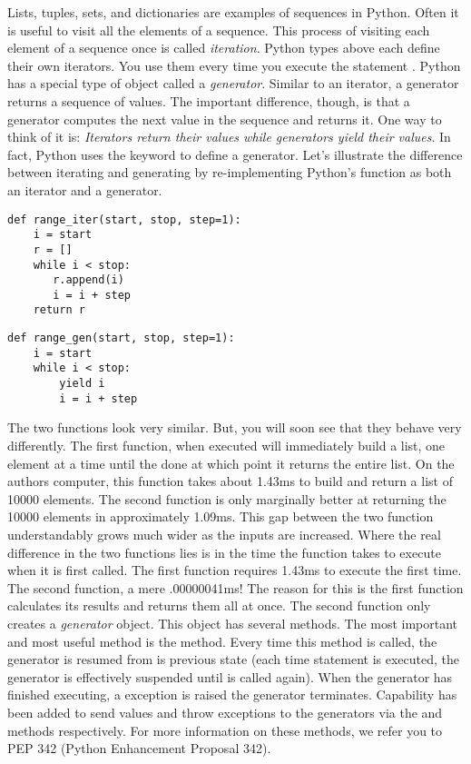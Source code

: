 \label{lab:Python_Generators}

Lists, tuples, sets, and dictionaries are examples of sequences in Python.
Often it is useful to visit all the elements of a sequence.  This process of visiting
each element of a sequence once is called \emph{iteration}. 
Python types above each define their own iterators.  You use them every time you execute the statement .
Python has a special type of object called a \emph{generator}.
Similar to an iterator, a generator returns a sequence of values.
The important difference, though, is that a generator computes the next value in the sequence and returns it.
One way to think of it is: \emph{Iterators return their values while generators yield their values}.
In fact, Python uses the  keyword to define a generator.
Let's illustrate the difference between iterating and generating by re-implementing Python's  function
as both an iterator and a generator.
\begin{lstlisting}
def range_iter(start, stop, step=1):
    i = start
    r = []
    while i < stop:
       r.append(i)
       i = i + step
    return r
\end{lstlisting}
\begin{lstlisting}
def range_gen(start, stop, step=1):
    i = start
    while i < stop:
        yield i
        i = i + step
\end{lstlisting}
The two functions look very similar.  But, you will soon see that they behave very differently.
The first function, when executed will immediately build a list, one element at a time until the done
at which point it returns the entire list.  On the authors computer, this function takes about 1.43ms
to build and return a list of 10000 elements.  The second function is only marginally better at
returning the 10000 elements in approximately 1.09ms.  
This gap between the two function understandably grows much wider as the inputs are increased.
Where the real difference in the two functions lies is in the time the function takes to execute when
it is first called.  The first function requires 1.43ms to execute the first time.  The second function,
a mere .00000041ms!  The reason for this is the first function calculates its results and returns them all at once.  The second function only creates a \emph{generator} object.  This object has several methods.
The most important and most useful method is the  method.  Every time this method is called, 
the generator is resumed from is previous state (each time  statement is executed, the generator 
is effectively suspended until  is called again).  When the generator has finished executing, a
 exception is raised the generator terminates.  Capability has been added to send values 
and throw exceptions to the generators via the  and  methods respectively.  For more information on these methods, we refer you to PEP 342 (Python Enhancement Proposal 342).

